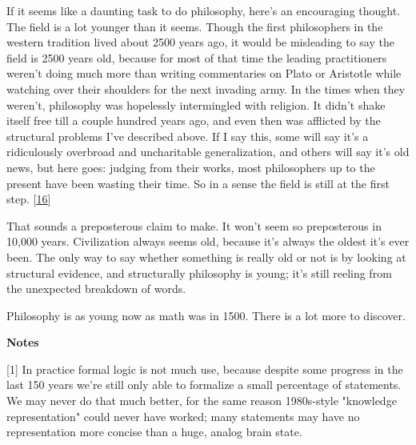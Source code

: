 If it seems like a daunting task
                  to do philosophy, here's an encouraging thought. The field is
                  a lot younger than it seems. Though the first philosophers in
                  the western tradition lived about 2500 years ago, it would be
                  misleading to say the field is 2500 years old, because for
                  most of that time the leading practitioners weren't doing much
                  more than writing commentaries on Plato or Aristotle while
                  watching over their shoulders for the next invading army. In
                  the times when they weren't, philosophy was hopelessly
                  intermingled with religion. It didn't shake itself free till a
                  couple hundred years ago, and even then was afflicted by the
                  structural problems I've described above. If I say this, some
                  will say it's a ridiculously overbroad and uncharitable
                  generalization, and others will say it's old news, but here
                  goes: judging from their works, most philosophers up to the
                  present have been wasting their time. So in a sense the field
                  is still at the first step.
                  [\href{\#f16n}{16}]

That sounds a preposterous claim to make. It
                  won't seem so preposterous in 10,000 years. Civilization
                  always seems old, because it's always the oldest it's ever
                  been. The only way to say whether something is really old or
                  not is by looking at structural evidence, and structurally
                  philosophy is young; it's still reeling from the unexpected
                  breakdown of words.

Philosophy is as young now as
                  math was in 1500. There is a lot more to discover.







\textbf{Notes}


                  [1] In practice formal logic is not much use, because despite
                  some progress in the last 150 years we're still only able to
                  formalize a small percentage of statements. We may never do
                  that much better, for the same reason 1980s-style "knowledge
                  representation" could never have worked; many statements may
                  have no representation more concise than a huge, analog brain
                  state.

